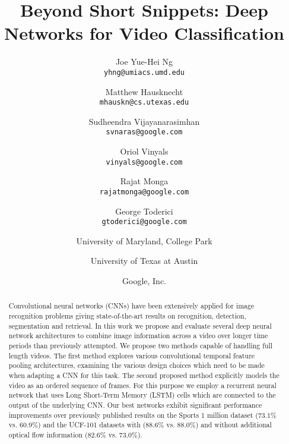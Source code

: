 \documentclass[10pt,twocolumn,letterpaper]{article}
\begin{document}
\title{Beyond Short Snippets: Deep Networks for Video Classification}

\author{Joe Yue-Hei Ng\\
{\tt\small yhng@umiacs.umd.edu} \\
\and
Matthew Hausknecht \\
{\tt\small mhauskn@cs.utexas.edu} \\
\and
Sudheendra Vijayanarasimhan \\
{\tt\small svnaras@google.com} \\
\and
Oriol Vinyals \\
{\tt\small vinyals@google.com} \\
\and
Rajat Monga \\
{\tt\small rajatmonga@google.com} \\
\and
George Toderici \\
{\tt\small gtoderici@google.com} \\
\and
University of Maryland, College Park\\
\and
University of Texas at Austin \\
\and
Google, Inc. \\
}

\maketitle
\begin{abstract}
Convolutional neural networks (CNNs) have been extensively applied for image
recognition problems giving state-of-the-art results on recognition, detection,
segmentation and retrieval.  In this work we propose and evaluate several deep
neural network architectures to combine image information across a video over
longer time periods than previously attempted.  We propose two methods capable of
handling full length videos. The first method explores various convolutional
temporal feature pooling architectures, examining the various design choices
which need to be made when adapting a CNN for this task. The second proposed
method explicitly models the video as an ordered sequence of frames. For this
purpose we employ a recurrent neural network that uses Long Short-Term Memory (LSTM)
cells which are connected to the output of the underlying CNN. Our best
networks exhibit significant performance improvements over previously published
results on the Sports 1 million dataset (73.1\% vs.  60.9\%) and the UCF-101
datasets with (88.6\% vs.  88.0\%) and without additional optical flow
information (82.6\% vs. 73.0\%).

\end{abstract}
\end{document}
